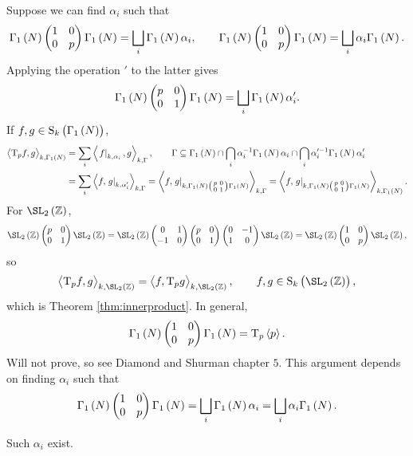 \pagebreak

Suppose we can find $ \alpha_i $ such that
$$ \Gamma_1\br{N}\twobytwo{1}{0}{0}{p}\Gamma_1\br{N} = \bigsqcup_i \Gamma_1\br{N}\alpha_i, \qquad \Gamma_1\br{N}\twobytwo{1}{0}{0}{p}\Gamma_1\br{N} = \bigsqcup_i \alpha_i\Gamma_1\br{N}. $$
Applying the operation $ ' $ to the latter gives
$$ \Gamma_1\br{N}\twobytwo{p}{0}{0}{1}\Gamma_1\br{N} = \bigsqcup_i \Gamma_1\br{N}\alpha_i'. $$
If $ f, g \in \S_k\br{\Gamma_1\br{N}} $,
\begin{align*}
\abr{\T_pf, g}_{k, \Gamma_1\br{N}}
& = \sum_i \abr{\eval{f}_{k, \alpha_i}, g}_{k, \Gamma}, \qquad \Gamma \subseteq \Gamma_1\br{N} \cap \bigcap_i \alpha_i^{-1}\Gamma_1\br{N}\alpha_i \cap \bigcap_i \alpha_i'^{-1}\Gamma_1\br{N}\alpha_i' \\
& = \sum_i \abr{f, \eval{g}_{k, \alpha_i'}}_{k, \Gamma}
= \abr{f, \eval{g}_{k, \Gamma_1\br{N}\twobytwosmall{p}{0}{0}{1}\Gamma_1\br{N}}}_{k, \Gamma}
= \abr{f, \eval{g}_{k, \Gamma_1\br{N}\twobytwosmall{p}{0}{0}{1}\Gamma_1\br{N}}}_{k, \Gamma_1\br{N}}.
\end{align*}
For $ \SL_2\br{\ZZ} $,
$$ \SL_2\br{\ZZ}\twobytwo{p}{0}{0}{1}\SL_2\br{\ZZ} = \SL_2\br{\ZZ}\twobytwo{0}{1}{-1}{0}\twobytwo{p}{0}{0}{1}\twobytwo{0}{-1}{1}{0}\SL_2\br{\ZZ} = \SL_2\br{\ZZ}\twobytwo{1}{0}{0}{p}\SL_2\br{\ZZ}, $$
so
$$ \abr{\T_pf, g}_{k, \SL_2\br{\ZZ}} = \abr{f, \T_pg}_{k, \SL_2\br{\ZZ}}, \qquad f, g \in \S_k\br{\SL_2\br{\ZZ}}, $$
which is Theorem \ref{thm:innerproduct}. In general,
$$ \Gamma_1\br{N}\twobytwo{1}{0}{0}{p}\Gamma_1\br{N} = \T_p\abr{p}. $$
Will not prove, so see Diamond and Shurman chapter $ 5 $. This argument depends on finding $ \alpha_i $ such that
$$ \Gamma_1\br{N}\twobytwo{1}{0}{0}{p}\Gamma_1\br{N} = \bigsqcup_i \Gamma_1\br{N}\alpha_i = \bigsqcup_i \alpha_i\Gamma_1\br{N}. $$

\begin{lemma}
Such $ \alpha_i $ exist.
\end{lemma}

